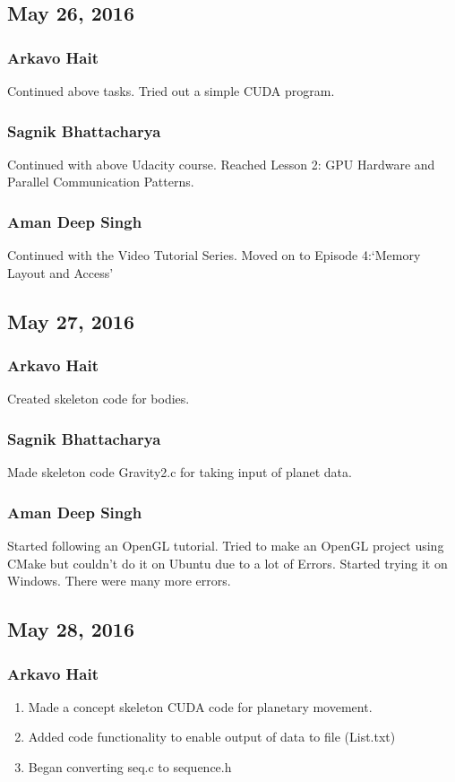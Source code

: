 \documentclass{article}
\begin{document}
\subsection*{May 26, 2016}
\subsubsection*{Arkavo Hait}
Continued above tasks. Tried out a simple CUDA program.
\subsubsection*{Sagnik Bhattacharya}
Continued with above Udacity course. Reached Lesson 2: GPU Hardware and Parallel Communication Patterns.
\subsubsection*{Aman Deep Singh}
Continued with the Video Tutorial Series. Moved on to Episode 4:`Memory Layout and Access'
\subsection*{May 27, 2016}
\subsubsection*{Arkavo Hait}
Created skeleton code for bodies.
\subsubsection*{Sagnik Bhattacharya}
Made skeleton code Gravity2.c for taking input of planet data.
\subsubsection*{Aman Deep Singh}
Started following an OpenGL tutorial. Tried to make an OpenGL project using CMake but couldn't do it on Ubuntu due to a lot of Errors. Started trying it on Windows. There were many more errors.
\subsection*{May 28, 2016}
\subsubsection*{Arkavo Hait}
\begin{enumerate}
	\item Made a concept skeleton CUDA code for planetary movement.
	\item Added code functionality to enable output of data to file (List.txt)
	\item Began converting seq.c to sequence.h
\end{enumerate}
\end{document}
